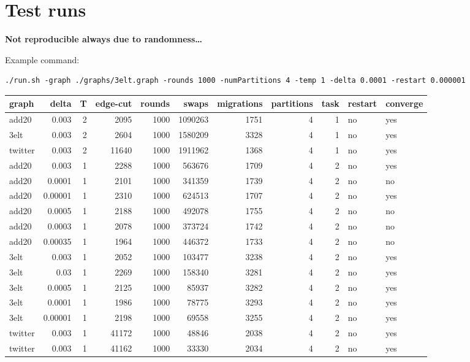 \documentclass[11pt]{article}
\author{Kim Hammar}
\date{\today}
\title{}
\begin{document}
\tableofcontents

\section{Test runs}
\label{sec:orge3faa1f}

\textbf{Not reproducible always due to randomness\ldots{}}

Example command:
\begin{verbatim}
./run.sh -graph ./graphs/3elt.graph -rounds 1000 -numPartitions 4 -temp 1 -delta 0.0001 -restart 0.000001
\end{verbatim}

\begin{center}
\begin{tabular}{lrrrrrrrrll}
graph & delta & T & edge-cut & rounds & swaps & migrations & partitions & task & restart & converge\\
\hline
add20 & 0.003 & 2 & 2095 & 1000 & 1090263 & 1751 & 4 & 1 & no & yes\\
3elt & 0.003 & 2 & 2604 & 1000 & 1580209 & 3328 & 4 & 1 & no & yes\\
twitter & 0.003 & 2 & 11640 & 1000 & 1911962 & 1368 & 4 & 1 & no & yes\\
add20 & 0.003 & 1 & 2288 & 1000 & 563676 & 1709 & 4 & 2 & no & yes\\
add20 & 0.0001 & 1 & 2101 & 1000 & 341359 & 1739 & 4 & 2 & no & no\\
add20 & 0.00001 & 1 & 2310 & 1000 & 624513 & 1707 & 4 & 2 & no & yes\\
add20 & 0.0005 & 1 & 2188 & 1000 & 492078 & 1755 & 4 & 2 & no & no\\
add20 & 0.0003 & 1 & 2078 & 1000 & 373724 & 1742 & 4 & 2 & no & no\\
add20 & 0.00035 & 1 & 1964 & 1000 & 446372 & 1733 & 4 & 2 & no & no\\
3elt & 0.003 & 1 & 2052 & 1000 & 103477 & 3238 & 4 & 2 & no & yes\\
3elt & 0.03 & 1 & 2269 & 1000 & 158340 & 3281 & 4 & 2 & no & yes\\
3elt & 0.0005 & 1 & 2125 & 1000 & 85937 & 3282 & 4 & 2 & no & yes\\
3elt & 0.0001 & 1 & 1986 & 1000 & 78775 & 3293 & 4 & 2 & no & yes\\
3elt & 0.00001 & 1 & 2198 & 1000 & 69558 & 3255 & 4 & 2 & no & yes\\
twitter & 0.003 & 1 & 41172 & 1000 & 48846 & 2038 & 4 & 2 & no & yes\\
twitter & 0.003 & 1 & 41162 & 1000 & 33330 & 2034 & 4 & 2 & no & yes\\

\end{tabular}
\end{center}
\end{document}
